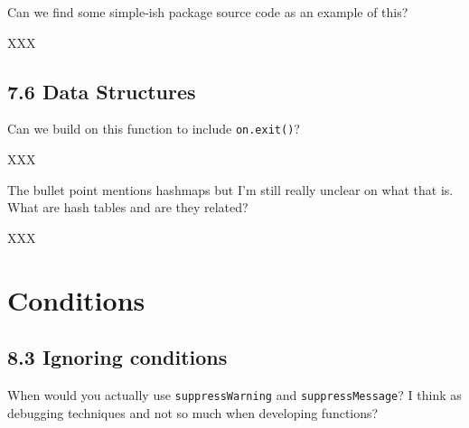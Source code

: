 \documentclass[]{book}
\newenvironment{Shaded}{\begin{snugshade}}{\end{snugshade}}
\newcommand{\ControlFlowTok}[1]{\textcolor[rgb]{0.13,0.29,0.53}{\textbf{#1}}}
\newcommand{\DataTypeTok}[1]{\textcolor[rgb]{0.13,0.29,0.53}{#1}}
\newcommand{\DecValTok}[1]{\textcolor[rgb]{0.00,0.00,0.81}{#1}}
\newcommand{\KeywordTok}[1]{\textcolor[rgb]{0.13,0.29,0.53}{\textbf{#1}}}
\newcommand{\NormalTok}[1]{#1}
\newcommand{\OperatorTok}[1]{\textcolor[rgb]{0.81,0.36,0.00}{\textbf{#1}}}
\newcommand{\StringTok}[1]{\textcolor[rgb]{0.31,0.60,0.02}{#1}}
\begin{document}
Can we find some simple-ish package source code as an example of this?

XXX

\hypertarget{data-structures}{%
\section*{7.6 Data Structures}\label{data-structures}}

Can we build on this function to include \texttt{on.exit()}?

\begin{Shaded}
\end{Shaded}

XXX

The bullet point mentions hashmaps but I'm still really unclear on what that is. What are hash tables and are they related?

XXX

\hypertarget{conditions}{%
\chapter{Conditions}\label{conditions}}

\hypertarget{ignoring-conditions}{%
\section*{8.3 Ignoring conditions}\label{ignoring-conditions}}

When would you actually use \texttt{suppressWarning} and \texttt{suppressMessage}? I think as debugging techniques and not so much when developing functions?
\end{document}
